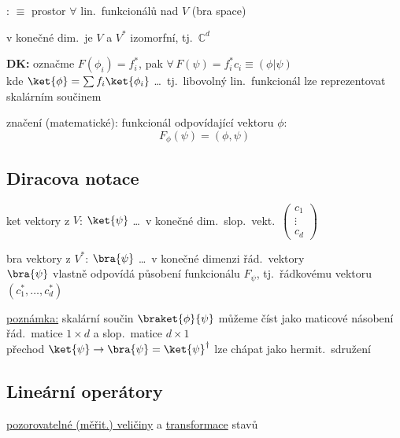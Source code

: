 \documentclass[11pt,a4paper]{article}
\begin{document}
\begin{definice}
: $\equiv$ prostor $\forall$ lin.\ funkcionálů nad $V$ \hfill (bra space) \\
\end{definice}

v konečné dim.\ je $V$ a $V^*$ izomorfní, tj.\ $\mathbb{C}^d$

\textbf{DK:} označme $F(\phi_i) = f_i^*$, \quad pak $\forall\, F(\psi) = f_i^* c_i \equiv (\phi|\psi)$ \\
\quad kde $\ket{\phi} = \sum f_i\ket{\phi_i}$ \quad \dots\ tj.\ libovolný lin.\ funkcionál lze reprezentovat skalárním součinem \\

značení (matematické): funkcionál odpovídající vektoru $\phi$:
\[ F_\phi(\psi) = (\phi,\psi) \]

\subsection*{Diracova notace}
ket vektory z $V$: $\ket{\psi}$ \quad \dots\ v konečné dim.\ slop.\ vekt.\ $\begin{pmatrix} c_1\\ \vdots\\ c_d\end{pmatrix}$

bra vektory z $V^*$: $\bra{\psi}$ \quad \dots\ v konečné dimenzi řád.\ vektory \\
\quad $\bra{\psi}$ vlastně odpovídá působení funkcionálu $F_\psi$, tj.\ řádkovému vektoru $(c_1^*,\dots,c_d^*)$

\underline{poznámka:} skalární součin $\braket{\phi}{\psi}$ můžeme číst jako maticové násobení řád.\ matice $1\times d$ a slop.\ matice $d\times 1$ \\
\quad přechod $\ket{\psi}\to\bra{\psi} = \ket{\psi}^\dagger$ lze chápat jako hermit.\ sdružení \\
\quad {}

\subsection*{Lineární operátory}
\hfill \underline{pozorovatelné (měřit.) veličiny} a \underline{transformace} stavů
\end{document}
